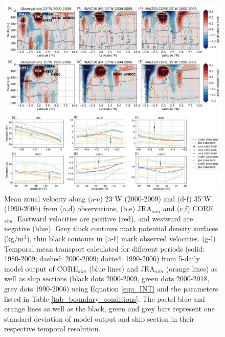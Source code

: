 \documentclass[os, manuscript]{copernicus}
\begin{document}
	\begin{figure}[t]
		\includegraphics[width=12cm]{../../figures/paper/f02_23w_35w_mean_vel_and_transport.png}
		\caption{Mean zonal velocity along (a-c) 23$^{\circ}$W (2000-2009) and (d-f) 35$^{\circ}$W (1990-2006) from (a,d) observations, (b,e) JRA$_{sim}$ and (c,f) CORE$_{sim}$. Eastward velocities are positive (red), and westward are negative (blue). Grey thick contours mark potential density surfaces (kg/m$^3$), thin black contours in (a-f) mark observed velocities. (g-l) Temporal mean transport calculated for different periods (solid: 1980-2009; dashed: 2000-2009; dotted: 1990-2006) from 5-daily model output of CORE$_{sim}$ (blue lines) and JRA$_{sim}$ (orange lines) as well as ship sections (black dots 2000-2009, green dots 2000-2018, grey dots 1990-2006) using Equation \ref{equ_INT} and the parameters listed in Table \ref{tab_boundary_conditions}. The pastel blue and orange lines as well as the black, green and grey bars represent one standard deviation of model output and ship section in their respective temporal resolution.}
		\label{fig_mean_vel}
	\end{figure}
	
\end{document}
